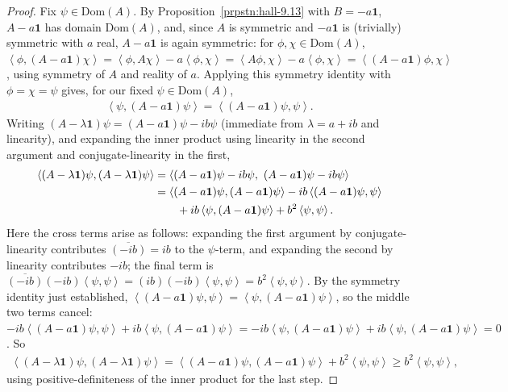 \begin{proof}
    \leanok
Fix $\psi \in \text{Dom}(A)$. By Proposition~\ref{prpstn:hall-9.13} with $B = -a\mathbf{1}$, $A - a\mathbf{1}$ has domain $\text{Dom}(A)$, and, since $A$ is symmetric and $-a\mathbf{1}$ is (trivially) symmetric with $a$ real, $A - a\mathbf{1}$ is again symmetric: for $\phi, \chi \in \text{Dom}(A)$, $\left< \phi, (A-a\mathbf{1})\chi \right> = \left< \phi, A\chi \right> - a\left< \phi, \chi \right> = \left< A\phi, \chi \right> - a \left< \phi, \chi \right> = \left< (A-a\mathbf{1})\phi, \chi \right>$, using symmetry of $A$ and reality of $a$. Applying this symmetry identity with $\phi = \chi = \psi$ gives, for our fixed $\psi \in \text{Dom}(A)$,
\begin{align}
    \left< \psi, (A-a\mathbf{1})\psi \right> = \left< (A-a\mathbf{1})\psi, \psi \right>.
\end{align}
Writing $(A - \lambda\mathbf{1})\psi = (A-a\mathbf{1})\psi - ib\psi$ (immediate from $\lambda = a+ib$ and linearity), and expanding the inner product using linearity in the second argument and conjugate-linearity in the first,
\begin{align}
    \left< (A-\lambda\mathbf{1})\psi, (A-\lambda\mathbf{1})\psi \right>
        &= \left< (A-a\mathbf{1})\psi - ib\psi,\ (A-a\mathbf{1})\psi - ib\psi \right> \\
        &= \left< (A-a\mathbf{1})\psi, (A-a\mathbf{1})\psi \right> - ib\left< (A-a\mathbf{1})\psi, \psi \right> \notag \\
        &\qquad + ib \left< \psi, (A-a\mathbf{1})\psi \right> + b^2 \left< \psi, \psi \right>.
\end{align}
Here the cross terms arise as follows: expanding the first argument by conjugate-linearity contributes $\overline{(-ib)} = ib$ to the $\psi$-term, and expanding the second by linearity contributes $-ib$; the final term is $\overline{(-ib)}(-ib)\left< \psi,\psi \right> = (ib)(-ib)\left< \psi,\psi\right> = b^2\left<\psi,\psi\right>$. By the symmetry identity just established, $\left< (A-a\mathbf{1})\psi, \psi \right> = \left< \psi, (A-a\mathbf{1})\psi \right>$, so the middle two terms cancel: $-ib\left< (A-a\mathbf{1})\psi, \psi \right> + ib \left< \psi, (A-a\mathbf{1})\psi \right> = -ib\left< \psi, (A-a\mathbf{1})\psi \right> + ib \left< \psi, (A-a\mathbf{1})\psi \right> = 0$. So
\begin{align}
    \left< (A-\lambda\mathbf{1})\psi, (A-\lambda\mathbf{1})\psi \right> = \left< (A-a\mathbf{1})\psi, (A-a\mathbf{1})\psi \right> + b^2 \left< \psi, \psi \right> \ge b^2 \left< \psi, \psi \right>,
\end{align}
using positive-definiteness of the inner product for the last step.
\end{proof}

